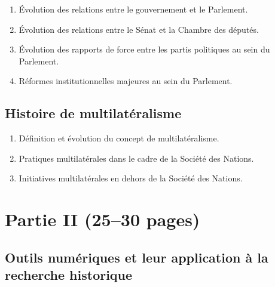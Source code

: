 \documentclass[12pt]{article}
\begin{document}
\begin{enumerate}[label=\alph*.]
    \item Évolution des relations entre le gouvernement et le Parlement.
    \item Évolution des relations entre le Sénat et la Chambre des députés.
    \item Évolution des rapports de force entre les partis politiques au sein du Parlement.
    \item Réformes institutionnelles majeures au sein du Parlement.
\end{enumerate}

\subsection*{Histoire de multilatéralisme}

\begin{enumerate}[label=\alph*.]
    \item Définition et évolution du concept de multilatéralisme.
    \item Pratiques multilatérales dans le cadre de la Société des Nations.
    \item Initiatives multilatérales en dehors de la Société des Nations.
\end{enumerate}

\section*{Partie II (25--30 pages)}

\subsection*{Outils numériques et leur application à la recherche historique}
\end{document}
